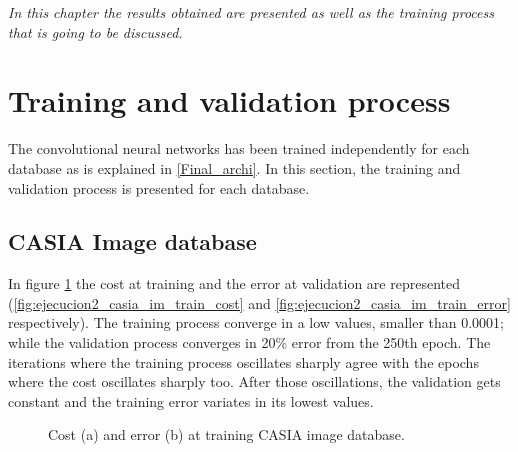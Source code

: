 
\begin{small}
\emph{In this chapter the results obtained are presented as well as the training process that is going to be discussed.\\}
\end{small}

\section{Training and validation process}
The convolutional neural networks has been trained independently for each database as is explained in \ref{Final_archi}. In this section, the training and validation process is presented for each database.\\
\subsection{CASIA Image database}
In figure \ref{fig:ejecucion2_casia_im_train} the cost at training and the error at validation are represented (\ref{fig:ejecucion2_casia_im_train_cost} and \ref{fig:ejecucion2_casia_im_train_error} respectively). The training process converge in a low values, smaller than 0.0001; while the validation process converges in 20\% error from the 250th epoch. The iterations where the training process oscillates sharply agree with the epochs where the cost oscillates sharply too. After those oscillations, the validation gets constant and the training error variates in its lowest values.\\
\begin{figure}[htb]
\centering
\caption{Cost (a) and error (b) at training CASIA image database.}
\label{fig:ejecucion2_casia_im_train}
\end{figure}

